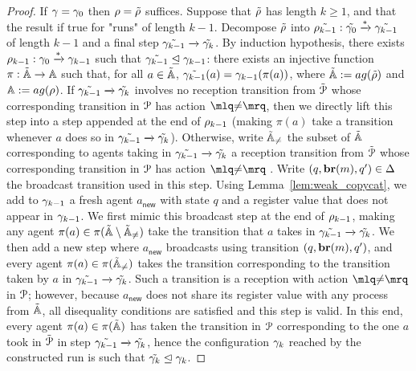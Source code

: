 \begin{proof}
If $\gamma = \gamma_0$ then $\rho = \tilde{\rho}$ suffices. Suppose that $\tilde{\rho}$ has length $k \geq 1$, and that the result if true for "runs" of length $k-1$. Decompose $\tilde{\rho}$ into $\tilde{\rho_{k-1}}: \tilde{\gamma_0} \xrightarrow{*} \tilde{\gamma_{k-1}}$ of length $k-1$ and a final step $\tilde{\gamma_{k-1}} \xrightarrow{} \tilde{\gamma_k}$. 
By induction hypothesis, there exists $\rho_{k-1}: \gamma_0 \xrightarrow{*} \gamma_{k-1}$ such that $\tilde{\gamma_{k-1}} \trianglelefteq \gamma_{k-1}$: there exists an injective function $\pi : \tilde{\mathbb{A}} \rightarrow \mathbb{A}$
 such that, for all $a \in \tilde{\mathbb{A}}$, $\tilde{\gamma_{k-1}}(a) = \gamma_{k-1}(\pi(a))$, where $\tilde{\agents} := \agentsof{\tilde{\run}}$ and $\agents := \agentsof{\run}$. If $\tilde{\gamma_{k-1}} \xrightarrow{} \tilde{\gamma_k}$ involves no reception transition from $\tilde{\mathcal{P}}$ whose corresponding transition in $\mathcal{P}$ has action $\quotemarks{\diseqtestact}$, then we directly lift this step into a step appended at the end of $\rho_{k-1}$ (making $\pi(a)$ take a transition whenever $a$ does so in $\tilde{\gamma_{k-1}} \xrightarrow{} \tilde{\gamma_k}$). Otherwise, write $\tilde{\mathbb{A}}_{{\ne}}$ the subset of $\tilde{\mathbb{A}}$ corresponding to agents taking in $\tilde{\gamma_{k-1}} \xrightarrow{} \tilde{\gamma_k}$ a reception transition from $\tilde{\mathcal{P}}$ whose corresponding transition in $\mathcal{P}$ has action $\quotemarks{\diseqtestact}$ . Write $(q, \textbf{br}(m), q') \in \Delta$ the broadcast transition used in this step.  Using Lemma~\ref{lem:weak_copycat}, we add to $\gamma_{k-1}$ a fresh agent $a_{\mathsf{new}}$ with state $q$ and a register value that does not appear in $\gamma_{k-1}$. 
We first mimic this broadcast step at the end of $\rho_{k-1}$, making any agent $\pi(a) \in \pi(\tilde{\mathbb{A}} \setminus \tilde{\mathbb{A}}_{{\ne}})$ take the transition that $a$ takes in $\tilde{\gamma_{k-1}} \xrightarrow{} \tilde{\gamma_k}$. We then add a new step where $a_{\mathsf{new}}$ broadcasts using transition $(q, \textbf{br}(m), q')$, and every agent $\pi(a) \in \pi(\tilde{\mathbb{A}}_{{\ne}})$ takes the transition corresponding to the transition taken by $a$ in $\tilde{\gamma_{k-1}} \xrightarrow{} \tilde{\gamma_k}$. Such a transition is a reception with action $\quotemarks{\diseqtestact}$ in $\mathcal{P}$; however, because $a_{\mathsf{new}}$ does not share its register value with any process from $\tilde{\mathbb{A}}$, all disequality conditions are satisfied and this step is valid. In this end, every agent $\pi(a) \in \pi(\tilde{\mathbb{A}})$ has taken the transition in $\mathcal{P}$ corresponding to the one $a$ took in $\tilde{\mathcal{P}}$ in step $\tilde{\gamma_{k-1}} \xrightarrow{} \tilde{\gamma_k}$, hence the configuration $\gamma_k$ reached by the constructed run is such that $\tilde{\gamma_k} \trianglelefteq \gamma_k$. 
\end{proof}
\fi

